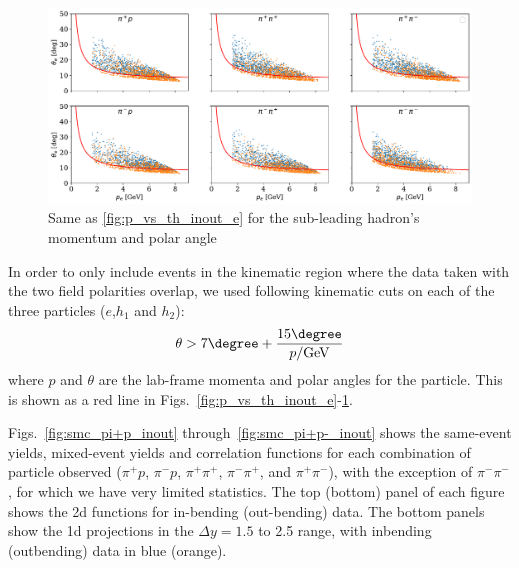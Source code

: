 \begin{figure}
    \centering
    \includegraphics[width=\textwidth]{p_vs_th_inout_e}
    \caption{Same as \ref{fig:p_vs_th_inout_e} for the sub-leading hadron's momentum and polar angle}
    \label{fig:p_vs_th_inout_h2}
\end{figure}

In order to only include events in the kinematic region where the data taken with the two field polarities overlap, we used following kinematic cuts on each of the three particles ($e$,$h_1$ and $h_2$):
\begin{equation}
    \theta > 7\degree + \frac{15\degree}{p/{\rm GeV}}
\end{equation}
where $p$ and $\theta$ are the lab-frame momenta and polar angles for the particle.  This is shown as a red line in Figs.~\ref{fig:p_vs_th_inout_e}-\ref{fig:p_vs_th_inout_h2}.  



Figs.~\ref{fig:smc_pi+p_inout} through~\ref{fig:smc_pi+p-_inout} shows the same-event yields, mixed-event yields and correlation functions for each combination of particle observed ($\pi^+ p$, $\pi^- p$, $\pi^+\pi^+$, $\pi^-\pi^+$, and $\pi^+\pi^-$), with the exception of $\pi^-\pi^-$, for which we have very limited statistics. The top (bottom) panel of each figure shows the 2d functions for in-bending (out-bending) data.  The bottom panels show the 1d projections in the $\Delta y=1.5$ to 2.5 range, with inbending (outbending) data in blue (orange).  